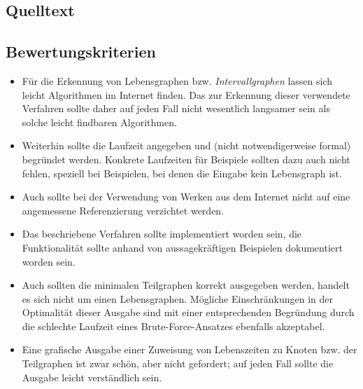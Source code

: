 \subsection{Quelltext}

{\small

}

\subsection{Bewertungskriterien}

\begin{itemize}
\item Für die Erkennung von Lebensgraphen bzw. \emph{Intervallgraphen} lassen sich leicht Algorithmen im Internet finden. Das zur Erkennung dieser verwendete Verfahren sollte daher auf jeden Fall nicht wesentlich langsamer sein als solche leicht findbaren Algorithmen.
\item Weiterhin sollte die Laufzeit angegeben und (nicht notwendigerweise formal) begründet werden. Konkrete Laufzeiten für Beispiele sollten dazu auch nicht fehlen, speziell bei Beispielen, bei denen die Eingabe kein Lebensgraph ist.
\item Auch sollte bei der Verwendung von Werken aus dem Internet nicht auf eine angemessene Referenzierung verzichtet werden.
\item Das beschriebene Verfahren sollte implementiert worden sein, die Funktionalität sollte anhand von aussagekräftigen Beispielen dokumentiert worden sein.
\item Auch sollten die minimalen Teilgraphen korrekt ausgegeben werden, handelt es sich nicht um einen Lebensgraphen. Mögliche Einschränkungen in der Optimalität dieser Ausgabe sind mit einer entsprechenden Begründung durch die schlechte Laufzeit eines Brute-Force-Ansatzes ebenfalls akzeptabel.
\item Eine grafische Ausgabe einer Zuweisung von Lebenszeiten zu Knoten bzw. der Teilgraphen ist zwar schön, aber nicht gefordert; auf jeden Fall sollte die Ausgabe leicht verständlich sein.
\end{itemize}
